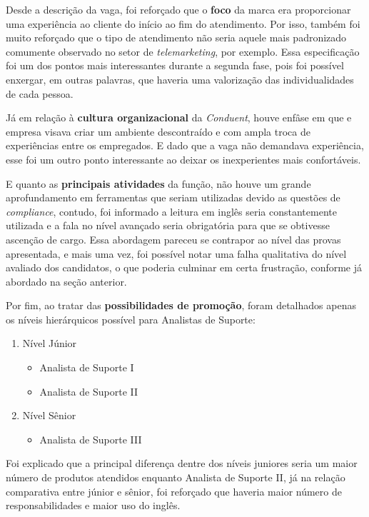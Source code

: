\documentclass[12pt]{article}
\begin{document}
Desde a descrição da vaga, foi reforçado que o \textbf{foco} da marca era proporcionar uma experiência ao cliente do início ao fim do atendimento. Por isso, também foi muito reforçado que o tipo de atendimento não seria aquele mais padronizado comumente observado no setor de \emph {telemarketing}, por exemplo. Essa especificação foi um dos pontos mais interessantes durante a segunda fase, pois foi possível enxergar, em outras palavras, que haveria uma valorização das individualidades de cada pessoa. 

Já em relação à \textbf{cultura organizacional} da \emph{Conduent}, houve enfâse em que e empresa visava criar um ambiente descontraído e com ampla troca de experiências entre os empregados. E dado que a vaga não demandava experiência, esse foi um outro ponto interessante ao deixar os inexperientes mais confortáveis.

E quanto as \textbf{principais atividades} da função, não houve um grande aprofundamento em ferramentas que seriam utilizadas devido as questões de \emph{compliance}, contudo, foi informado a leitura em inglês seria constantemente utilizada e a fala no nível avançado seria obrigatória para que se obtivesse ascenção de cargo. Essa abordagem pareceu se contrapor ao nível das provas apresentada, e mais uma vez, foi possível notar uma falha qualitativa do nível avaliado dos candidatos, o que poderia culminar em certa frustração, conforme já abordado na seção anterior. 

Por fim, ao tratar das \textbf{possibilidades de promoção}, foram detalhados apenas os níveis hierárquicos possível para Analistas de Suporte: 

\begin{enumerate}
   \item Nível Júnior
   \begin{itemize}
     \item Analista de Suporte I
     \item  Analista de Suporte II
   \end{itemize}
   \item Nível Sênior
   \begin{itemize}
     \item Analista de Suporte III
     \end{itemize}
\end{enumerate}

Foi explicado que a principal diferença dentre dos níveis juniores seria um maior número de produtos atendidos enquanto Analista de Suporte II, já na relação comparativa entre júnior e sênior, foi reforçado que haveria maior número de responsabilidades e maior uso do inglês. 
\end{document}

